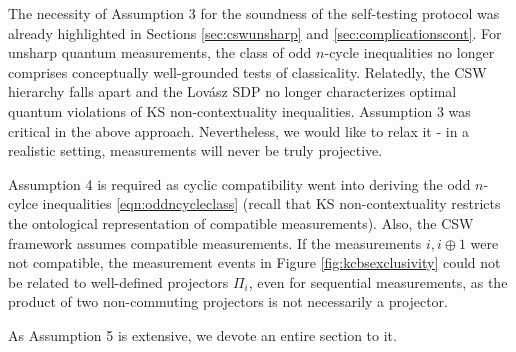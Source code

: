 The necessity of Assumption 3 for the soundness of the self-testing protocol was already highlighted in Sections \ref{sec:cswunsharp} and \ref{sec:complicationscont}. For unsharp quantum measurements, the class of odd $n$-cycle inequalities no longer comprises conceptually well-grounded tests of classicality. Relatedly, the CSW hierarchy falls apart and the Lovász SDP no longer characterizes optimal quantum violations of KS non-contextuality inequalities. Assumption 3 was critical in the above approach. Nevertheless, we would like to relax it - in a realistic setting, measurements will never be truly projective.

Assumption 4 is required as cyclic compatibility went into deriving the odd $n$-cylce inequalities \ref{eqn:oddncycleclass} (recall that KS non-contextuality restricts the ontological representation of compatible measurements). Also, the CSW framework assumes compatible measurements. If the measurements $i,i\oplus 1$ were not compatible, the measurement events in Figure \ref{fig:kcbsexclusivity} could not be related to well-defined projectors $\Pi_i$, even for sequential measurements, as the product of two non-commuting projectors is not necessarily a projector.

As Assumption 5 is extensive, we devote an entire section to it. 

